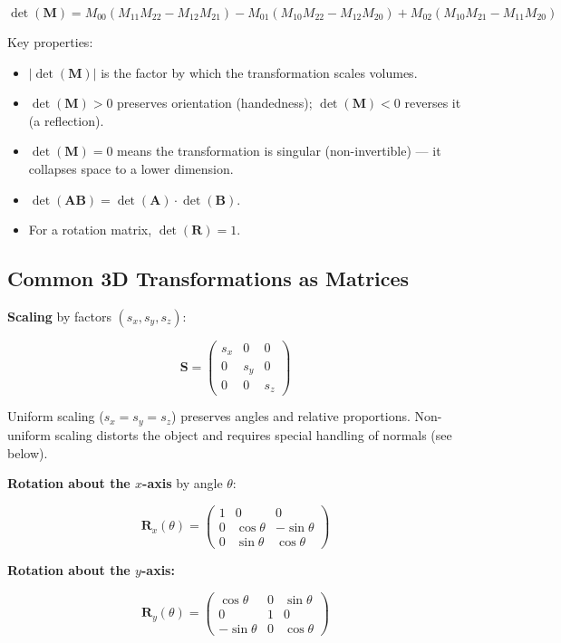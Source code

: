 \documentclass[
  11pt,
  letterpaper,
  DIV=11,
  numbers=noendperiod,
  twoside,
  open=right]{scrreprt}
\providecommand{\tightlist}{%
  \setlength{\itemsep}{0pt}\setlength{\parskip}{0pt}}
\begin{document}
\[
\det(\mathbf{M}) = M_{00}(M_{11}M_{22} - M_{12}M_{21}) - M_{01}(M_{10}M_{22} - M_{12}M_{20}) + M_{02}(M_{10}M_{21} - M_{11}M_{20})
\]

Key properties:

\begin{itemize}
\tightlist
\item
  \(|\det(\mathbf{M})|\) is the factor by which the transformation
  scales volumes.
\item
  \(\det(\mathbf{M}) > 0\) preserves orientation (handedness);
  \(\det(\mathbf{M}) < 0\) reverses it (a reflection).
\item
  \(\det(\mathbf{M}) = 0\) means the transformation is singular
  (non-invertible) --- it collapses space to a lower dimension.
\item
  \(\det(\mathbf{A}\mathbf{B}) = \det(\mathbf{A}) \cdot \det(\mathbf{B})\).
\item
  For a rotation matrix, \(\det(\mathbf{R}) = 1\).
\end{itemize}

\subsection{Common 3D Transformations as
Matrices}\label{common-3d-transformations-as-matrices}

\textbf{Scaling} by factors \((s_x, s_y, s_z)\):

\[
\mathbf{S} = \begin{pmatrix} s_x & 0 & 0 \\ 0 & s_y & 0 \\ 0 & 0 & s_z \end{pmatrix}
\]

Uniform scaling (\(s_x = s_y = s_z\)) preserves angles and relative
proportions. Non-uniform scaling distorts the object and requires
special handling of normals (see below).

\textbf{Rotation about the \(x\)-axis} by angle \(\theta\):

\[
\mathbf{R}_x(\theta) = \begin{pmatrix} 1 & 0 & 0 \\ 0 & \cos\theta & -\sin\theta \\ 0 & \sin\theta & \cos\theta \end{pmatrix}
\]

\textbf{Rotation about the \(y\)-axis:}

\[
\mathbf{R}_y(\theta) = \begin{pmatrix} \cos\theta & 0 & \sin\theta \\ 0 & 1 & 0 \\ -\sin\theta & 0 & \cos\theta \end{pmatrix}
\]
\end{document}
